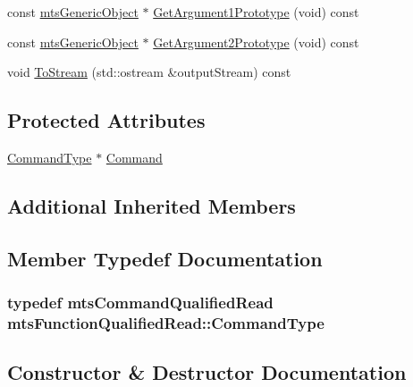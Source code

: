 \begin{DoxyCompactItemize}
\item 
const \hyperlink{classmts_generic_object}{mts\+Generic\+Object} $\ast$ \hyperlink{classmts_function_qualified_read_a0775c24702c6168fa9a51187a3c199dc}{Get\+Argument1\+Prototype} (void) const 
\item 
const \hyperlink{classmts_generic_object}{mts\+Generic\+Object} $\ast$ \hyperlink{classmts_function_qualified_read_a5fa40186a3f0a87890d38db5ff63c4ce}{Get\+Argument2\+Prototype} (void) const 
\item 
void \hyperlink{classmts_function_qualified_read_afd4e7f95358d09fab3f63f0c2e3ed1ef}{To\+Stream} (std\+::ostream \&output\+Stream) const 
\end{DoxyCompactItemize}
\subsection*{Protected Attributes}
\begin{DoxyCompactItemize}
\item 
\hyperlink{classmts_function_qualified_read_ae78bcee54ee0392f510d2f33600c316f}{Command\+Type} $\ast$ \hyperlink{classmts_function_qualified_read_a7ac0f02300ec56afa037eefb3cb55cef}{Command}
\end{DoxyCompactItemize}
\subsection*{Additional Inherited Members}


\subsection{Member Typedef Documentation}
\hypertarget{classmts_function_qualified_read_ae78bcee54ee0392f510d2f33600c316f}{}
\subsubsection[{Command\+Type}]{\setlength{\rightskip}{0pt plus 5cm}typedef {\bf mts\+Command\+Qualified\+Read} {\bf mts\+Function\+Qualified\+Read\+::\+Command\+Type}}\label{classmts_function_qualified_read_ae78bcee54ee0392f510d2f33600c316f}


\subsection{Constructor \& Destructor Documentation}
\hypertarget{classmts_function_qualified_read_a1776e3e0648e47435d9460b1e964140f}{}
